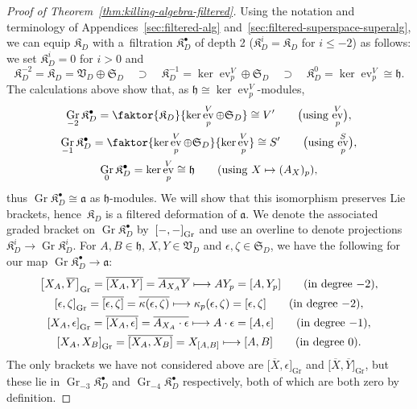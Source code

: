 \documentclass[11pt]{article}
\numberwithin{equation}{section}
\numberwithin{equation}{section}
\newcommand{\fa}{\mathfrak{a}}
\newcommand{\fh}{\mathfrak{h}}
\newcommand{\fK}{\mathfrak{K}}
\newcommand{\fS}{\mathfrak{S}}
\newcommand{\fV}{\mathfrak{V}}
\newcommand{\1}{\mathbbm{1}}
\DeclareMathOperator{\Gr}{Gr}
\DeclareMathOperator{\evaluate}{ev}
\begin{document}
\begin{proof}[Proof of Theorem~\ref{thm:killing-algebra-filtered}]
	Using the notation and terminology of Appendices~\ref{sec:filtered-alg} and~\ref{sec:filtered-superspace-superalg}, we can equip $\fK_D$ with a~filtration $\fK_D^\bullet$ of depth 2 ($\fK_D^i = \fK_D$ for $i\leq-2$) as follows: we set $\fK_D^i = 0$ for $i>0$ and
	\[
		\fK_D^{-2}=\fK_D = \fV_D\oplus\fS_D \quad \supset \quad
		\fK_D^{-1} = \ker\evaluate^V_p\oplus \fS_D \quad \supset \quad
		\fK_D^0 = \ker\evaluate^V_p\cong \fh.
	\]
	The calculations above show that, as $\fh\cong\ker\evaluate^V_p$-modules,
	\begin{gather*}
		\Gr_{-2}\fK_D^\bullet = \faktor{\fK_D}{\ker\evaluate^V_p\oplus\fS_D} \cong V' \qquad \text{\big(using $\evaluate^V_p$\big)},	\\
		\Gr_{-1}\fK_D^\bullet = \faktor{\ker\evaluate^V_p\oplus\fS_D}{\ker\evaluate^V_p} \cong S'	\qquad \text{\big(using $\evaluate^{S}_p$\big)},	\\
		\Gr_0 \fK_D^\bullet = \ker\evaluate^V_p \cong \fh \qquad\text{(using $X\mapsto (A_X)_p$)},
	\end{gather*}
	thus $\Gr\fK_D^\bullet\cong\fa$ as $\fh$-modules. We will show that this isomorphism preserves Lie brackets, hence~$\fK_D$ is a filtered deformation of $\fa$. We denote the associated graded bracket on $\Gr\fK_D^\bullet$ by~$\comm{-}{-}_{\mathrm{Gr}}$ and use an overline to denote projections $\fK_D^i\to\Gr\fK_D^i$. For $A,B\in\fh$, $X,Y\in\fV_D$ and $\epsilon,\zeta\in\fS_D$, we have the following for our map $\Gr\fK_D^\bullet\to\fa$:
	\begin{gather*}
		\comm{X_A}{\overline{Y}}_{\mathrm{Gr}} = \overline{\comm{X_A}{Y}} = \overline{A_{X_A}Y}
			 \longmapsto 	 A Y_p = \comm{A}{Y_p}	\qquad (\text{in degree $-2$}),	\\
		\comm{\epsilon}{\zeta}_{\mathrm{Gr}} = \overline{\comm{\epsilon}{\zeta}} = \overline{\kappa(\epsilon,\zeta)}
			 \longmapsto 	 \kappa_p(\epsilon,\zeta) = \comm{\epsilon}{\zeta}	\qquad (\text{in degree $-2$}),	\\
		\comm{X_A}{\epsilon}_{\mathrm{Gr}} = \overline{\comm{X_A}{\epsilon}} = \overline{A_{X_A}\cdot\epsilon}
			 \longmapsto 	 A\cdot \epsilon = \comm{A}{\epsilon}	\qquad (\text{in degree $-1$}),	\\
		\comm{X_A}{X_B}_{\mathrm{Gr}} = \overline{\comm{X_A}{X_B}} = X_{\comm{A}{B}}
		 \longmapsto 	 \comm{A}{B}	\qquad (\text{in degree $0$}).
	\end{gather*}
	The only brackets we have not considered above are $\big[\overline{X},\epsilon\big]_{\mathrm{Gr}}$ and $\big[\overline{X},\overline{Y}\big]_{\mathrm{Gr}}$, but these lie in $\Gr_{-3}\fK_D^\bullet$ and $\Gr_{-4}\fK_D^\bullet$ respectively, both of which are both zero by definition.
	\end{proof}
	
\end{document}
